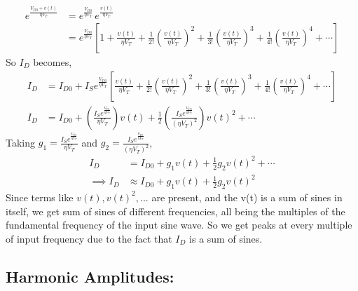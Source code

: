 \documentclass[12pt,a4paper]{article}
\begin{document}
\begin{align*}
e^{\frac{V_{D0} + v(t)}{\eta V_T}}
&= e^{\frac{V_{D0}}{\eta V_T}} \, e^{\frac{v(t)}{\eta V_T}} \\[6pt]
&= e^{\frac{V_{D0}}{\eta V_T}}
\left[
1
+ \frac{v(t)}{\eta V_T}
+ \frac{1}{2!}\left(\frac{v(t)}{\eta V_T}\right)^2
+ \frac{1}{3!}\left(\frac{v(t)}{\eta V_T}\right)^3
+ \frac{1}{4!}\left(\frac{v(t)}{\eta V_T}\right)^4
+ \cdots
\right]
\end{align*}
So $I_D$ becomes,
\begin{align*}
    I_D &= I_{D0} + I_S e^{\frac{V_{D0}}{\eta V_T}}\left[ \frac{v(t)}{\eta V_T}
+ \frac{1}{2!}\left(\frac{v(t)}{\eta V_T}\right)^2
+ \frac{1}{3!}\left(\frac{v(t)}{\eta V_T}\right)^3
+ \frac{1}{4!}\left(\frac{v(t)}{\eta V_T}\right)^4
+ \cdots \right]\\
I_D &= I_{D0} + \left(\frac{I_S e^{\frac{V_{D0}}{\eta V_T}}}{\eta V_T}\right)v(t)
+ \frac{1}{2}\left(\frac{I_S e^{\frac{V_{D0}}{\eta V_T}}}{(\eta V_T)^2}\right)v(t)^2 + \cdots
\end{align*}
Taking $g_1 = \frac{I_S e^{\frac{V_{D0}}{\eta V_T}}}{\eta V_T}$ and $g_2 = \frac{I_S e^{\frac{V_{D0}}{\eta V_T}}}{(\eta V_T)^2}$,
\begin{align*}
    I_D &= I_{D0} + g_1v(t) + \frac{1}{2}g_2v(t)^2 + \cdots\\
    \implies I_D &\approx I_{D0} + g_1v(t) + \frac{1}{2}g_2v(t)^2
\end{align*}
Since terms like $v(t), v(t)^2,...$ are present, and the v(t) is a sum of sines in itself, we get sum of sines of different frequencies, all being the multiples of the fundamental frequency of the input sine wave. So we get peaks at every multiple of input frequency due to the fact that $I_D$ is a sum of sines.

\subsection*{Harmonic Amplitudes:}
\end{document}

